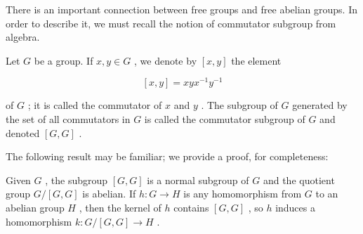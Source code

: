 There is an important connection between free groups and free abelian groups. In order to describe it, we must recall the notion of commutator subgroup from algebra.

\begin{definition} Let \(G\) be a group. If \(x,y \in  G\) , we denote by \(\left\lbrack  {x,y}\right\rbrack\) the element

\[
\left\lbrack  {x,y}\right\rbrack = {xy}{x}^{-1}{y}^{-1}
\]

of \(G\) ; it is called the commutator of \(x\) and \(y\) . The subgroup of \(G\) generated by the set of all commutators in \(G\) is called the commutator subgroup of \(G\) and denoted \(\left\lbrack  {G,G}\right\rbrack\) .
\end{definition}

The following result may be familiar; we provide a proof, for completeness:

\begin{lemma} Given \(G\) , the subgroup \(\left\lbrack  {G,G}\right\rbrack\) is a normal subgroup of \(G\) and the quotient group \(G/\left\lbrack  {G,G}\right\rbrack\) is abelian. If \(h : G \rightarrow  H\) is any homomorphism from \(G\) to an abelian group \(H\) , then the kernel of \(h\) contains \(\left\lbrack  {G,G}\right\rbrack\) , so \(h\) induces a homomorphism \(k : G/\left\lbrack  {G,G}\right\rbrack \rightarrow  H\) .
\end{lemma}

